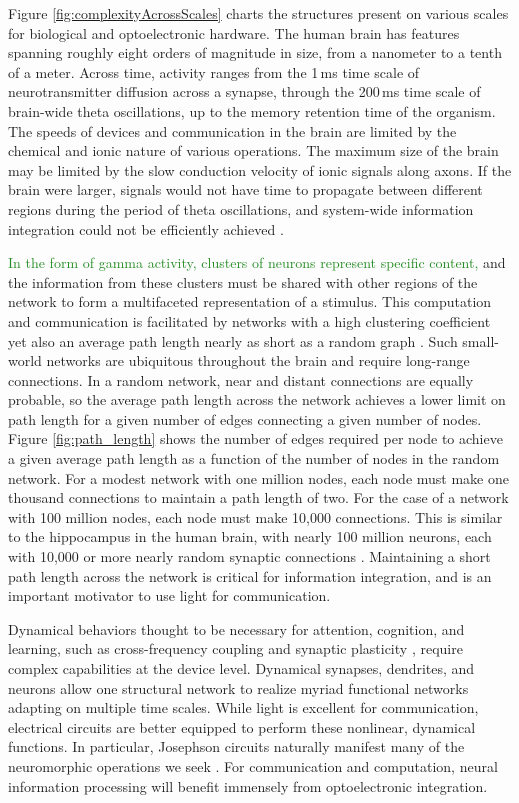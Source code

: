 \documentclass[twocolumn]{article}
\begin{document}
{Figure \ref{fig:complexityAcrossScales} charts the structures present on various scales for biological and optoelectronic hardware. The human brain has features spanning roughly eight orders of magnitude in size, from a nanometer to a tenth of a meter. Across time, activity ranges from the 1\,ms time scale of neurotransmitter diffusion across a synapse, through the 200\,ms time scale of brain-wide theta oscillations, up to the memory retention time of the organism. The speeds of devices and communication in the brain are limited by the chemical and ionic nature of various operations. The maximum size of the brain may be limited by the slow conduction velocity of ionic signals along axons. If the brain were larger, signals would not have time to propagate between different regions during the period of theta oscillations, and system-wide information integration could not be efficiently achieved \cite{bu2006,sh2018_ICRC}.

\textcolor{ForestGreen}{In the form of gamma activity, clusters of neurons represent specific content,} and the information from these clusters must be shared with other regions of the network to form a multifaceted representation of a stimulus. This computation and communication is facilitated by networks with a high clustering coefficient yet also an average path length nearly as short as a random graph \cite{eskn2015}. Such small-world networks \cite{wast1998} are ubiquitous throughout the brain \cite{sp2010} and require long-range connections. In a random network, near and distant connections are equally probable, so the average path length across the network achieves a lower limit on path length for a given number of edges connecting a given number of nodes. Figure \ref{fig:path_length} shows the number of edges required per node to achieve a given average path length as a function of the number of nodes in the random network. For a modest network with one million nodes, each node must make one thousand connections to maintain a path length of two. For the case of a network with 100 million nodes, each node must make 10,000 connections. This is similar to the hippocampus in the human brain, with nearly 100 million neurons, each with 10,000 or more nearly random synaptic connections \cite{bu2006}. Maintaining a short path length across the network is critical for information integration, and is an important motivator to use light for communication.

Dynamical behaviors thought to be necessary for attention, cognition, and learning, such as cross-frequency coupling \cite{bu2006} and synaptic plasticity \cite{mage2012,ab2008,fudr2005}, require complex capabilities at the device level. Dynamical synapses, dendrites, and neurons allow one structural network to realize myriad functional networks adapting on multiple time scales. While light is excellent for communication, electrical circuits are better equipped to perform these nonlinear, dynamical functions. In particular, Josephson circuits naturally manifest many of the neuromorphic operations we seek \cite{sh2018,sh2020}. For communication and computation, neural information processing will benefit immensely from optoelectronic integration.

}
\end{document}
